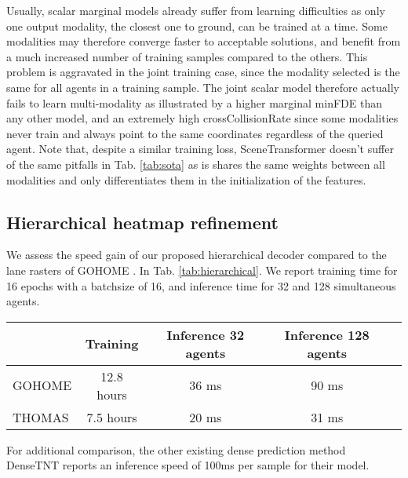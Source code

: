 \documentclass{article} \usepackage{iclr2022_conference,times}
\begin{document}
 Usually, scalar marginal models already suffer from learning difficulties as only one output modality, the closest one to ground, can be trained at a time. Some modalities may therefore converge faster to acceptable solutions, and benefit from a much increased number of training samples compared to the others. This problem is aggravated in the joint training case, since the modality selected is the same for all agents in a training sample. The joint scalar model therefore actually fails to learn multi-modality as illustrated by a higher marginal minFDE than any other model, and an extremely high crossCollisionRate since some modalities never train and always point to the same coordinates regardless of the queried agent. Note that, despite a similar training loss, SceneTransformer doesn't suffer of the same pitfalls in Tab. \ref{tab:sota} as is shares the same weights between all modalities and only differentiates them in the initialization of the features. 






\subsection{Hierarchical heatmap refinement}

We assess the speed gain of our proposed hierarchical decoder compared to the lane rasters of GOHOME \cite{gilles2021gohome}. In Tab. \ref{tab:hierarchical}. We report training time for 16 epochs with a batchsize of 16, and inference time for 32 and 128 simultaneous agents.
\begin{table*}[h]
\caption{Comparison of consistent solutions on Interpret multi-agent validation track}
    \begin{center}
    \begin{tabular}{l |c c c c}
      \hline
       & Training & Inference 32 agents & Inference 128 agents\\
      \hline
      GOHOME & 12.8 hours  & 36 ms & 90 ms \\
      THOMAS  & 7.5 hours   & 20 ms & 31 ms \\



      \hline
    \end{tabular}
    \end{center}
    \label{tab:hierarchical}
\end{table*}

For additional comparison, the other existing dense prediction method DenseTNT \citep{gu2021densetnt} reports an inference speed of 100ms per sample for their model.
\end{document}
